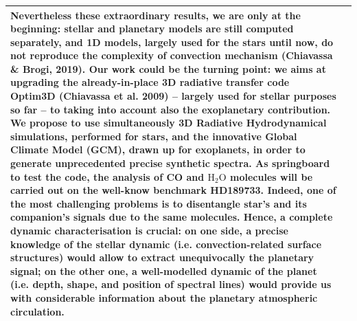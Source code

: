 \documentclass[a4paper]{report}
\begin{document}
\begin{tabularx}{\textwidth}{>{}p{2cm} >{\RaggedRight}X}
Nevertheless these extraordinary results, we are only at the beginning: stellar and planetary models are still computed separately, and 1D models, largely used for the stars until now, do not reproduce the complexity of convection mechanism (Chiavassa \& Brogi, 2019). Our work could be the turning point: we aims at upgrading the already-in-place 3D radiative transfer code Optim3D (Chiavassa et al. 2009) -- largely used for stellar purposes so far -- to taking into account also the exoplanetary contribution. We propose to use simultaneously 3D Radiative Hydrodynamical simulations, performed for stars, and the innovative Global Climate Model (GCM), drawn up for exoplanets, in order to generate unprecedented precise synthetic spectra. As springboard to test the code, the analysis of CO and $\mathrm{H}_2\mathrm{O}$ molecules will be carried out on the well-know benchmark HD189733. Indeed, one of the most challenging problems is to disentangle star’s and its companion’s signals due to the same molecules. Hence, a complete dynamic characterisation is crucial: on one side, a precise knowledge of the stellar dynamic (i.e. convection-related surface structures) would allow to extract unequivocally the planetary signal; on the other one, a well-modelled dynamic of the planet (i.e. depth, shape, and position of spectral lines) would provide us with considerable information about the planetary atmospheric circulation.
 \\
                                                                \bottomrule
        \end{tabularx}

    
\end{document}
